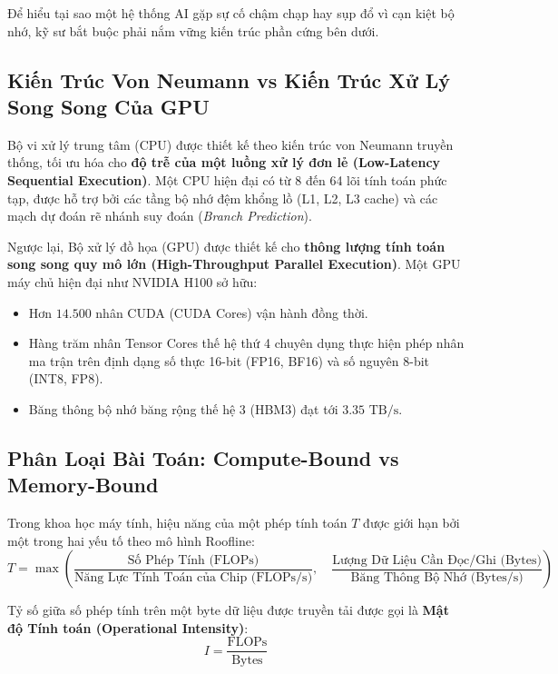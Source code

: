 Để hiểu tại sao một hệ thống AI gặp sự cố chậm chạp hay sụp đổ vì cạn kiệt bộ nhớ, kỹ sư bắt buộc phải nắm vững kiến trúc phần cứng bên dưới.

\subsection{Kiến Trúc Von Neumann vs Kiến Trúc Xử Lý Song Song Của GPU}

Bộ vi xử lý trung tâm (CPU) được thiết kế theo kiến trúc von Neumann truyền thống, tối ưu hóa cho \textbf{độ trễ của một luồng xử lý đơn lẻ (Low-Latency Sequential Execution)}. Một CPU hiện đại có từ 8 đến 64 lõi tính toán phức tạp, được hỗ trợ bởi các tầng bộ nhớ đệm khổng lồ (L1, L2, L3 cache) và các mạch dự đoán rẽ nhánh suy đoán (\textit{Branch Prediction}).

Ngược lại, Bộ xử lý đồ họa (GPU) được thiết kế cho \textbf{thông lượng tính toán song song quy mô lớn (High-Throughput Parallel Execution)}. Một GPU máy chủ hiện đại như NVIDIA H100 sở hữu:
\begin{itemize}
  \item Hơn $14.500$ nhân CUDA (CUDA Cores) vận hành đồng thời.
  \item Hàng trăm nhân Tensor Cores thế hệ thứ 4 chuyên dụng thực hiện phép nhân ma trận trên định dạng số thực 16-bit (FP16, BF16) và số nguyên 8-bit (INT8, FP8).
  \item Băng thông bộ nhớ băng rộng thế hệ 3 (HBM3) đạt tới $3.35\text{ TB/s}$.
\end{itemize}

\subsection{Phân Loại Bài Toán: Compute-Bound vs Memory-Bound}

Trong khoa học máy tính, hiệu năng của một phép tính toán $T$ được giới hạn bởi một trong hai yếu tố theo mô hình Roofline:
\begin{equation}
T = \max\left( \frac{\text{Số Phép Tính (FLOPs)}}{\text{Năng Lực Tính Toán của Chip (FLOPs/s)}}, \quad \frac{\text{Lượng Dữ Liệu Cần Đọc/Ghi (Bytes)}}{\text{Băng Thông Bộ Nhớ (Bytes/s)}} \right)
\label{eq:roofline-model}
\end{equation}

Tỷ số giữa số phép tính trên một byte dữ liệu được truyền tải được gọi là \textbf{Mật độ Tính toán (Operational Intensity)}:
\begin{equation}
I = \frac{\text{FLOPs}}{\text{Bytes}}
\label{eq:operational-intensity}
\end{equation}

